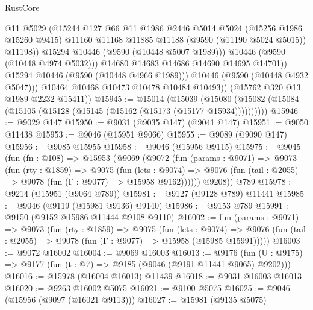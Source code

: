 \begin{lexlean}{RustCore}
\begin{coremodule}
                        @11
                        @5029
                        (@15244
                          @127
                          @66
                          @11
                          @1986
                          @2446
                          @5014
                          @5024
                          (@15256 @1986 @15260 @9415)
                          @11160
                          @11168
                          @11885
                          @11188
                          (@9590 (@11190 @5024 @5015))
                          @11198))
                      @15294
                      @10446
                      (@9590 (@10448 @5007 @1989)))
                    @10446
                    (@9590 (@10448 @4974 @5032)))
                  @14680
                  @14683
                  @14686
                  @14690
                  @14695
                  @14701))
              @15294
              @10446
              (@9590 (@10448 @4966 @1989)))
            @10446
            (@9590 (@10448 @4932 @5047)))
          @10464
          @10468
          @10473
          @10478
          @10484
          @10493))
      (@15762 @320 @13 @1989 @2232 @15411))
@15945 := @15014
    (@15039 (@15080 (@15082 (@15084 (@15105 (@15128 (@15145 (@15162 (@15173 (@15177 @15934))))))))))
@15946 := @9029 @147
@15950 := @9031 (@9035 @147) (@9041 @147)
@15951 := @9050 @11438
@15953 := @9046 (@15951 @9066)
@15955 := @9089 (@9090 @147)
@15956 := @9085 @15955
@15958 := @9046 (@15956 @9115)
@15975 := @9045
    (fun (fn : @108) =>
    @15953
      (@9069
        (@9072
          (fun (params : @9071) =>
          @9073
            (fun (rty : @1859) =>
            @9075
              (fun (lets : @9074) =>
              @9076 (fun (tail : @2055) => @9078 (fun (Γ : @9077) => @15958 @9162))))))
        @9208))
    @789
@15978 := @9214 (@15951 (@9064 @789))
@15981 := @9127 (@9128 @789) @11441
@15985 := @9046 (@9119 (@15981 @9136) @9140)
@15986 := @9153 @789
@15991 := @9150 (@9152 @15986 @11444 @9108 @9110)
@16002 := fun (params : @9071) =>
  @9073
    (fun (rty : @1859) =>
    @9075
      (fun (lets : @9074) =>
      @9076 (fun (tail : @2055) => @9078 (fun (Γ : @9077) => @15958 (@15985 @15991)))))
@16003 := @9072 @16002
@16004 := @9069 @16003
@16013 := @9176
    (fun (U : @9175) => @9177 (fun (t : @7) => @9185 (@9046 (@9191 @11441 @9065) @9202)))
@16016 := @15978 (@16004 @16013) @11439
@16018 := @9031 @16003 @16013
@16020 := @9263 @16002 @5075
@16021 := @9100 @5075
@16025 := @9046 (@15956 (@9097 (@16021 @9113)))
@16027 := @15981 (@9135 @5075)

\end{coremodule}
\end{lexlean}

